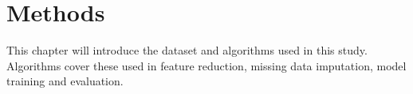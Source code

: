 \documentclass[12pt,a4paper,english
]{tunithesis}
\begin{document}

\chapter{Methods}
\label{ch:methods}
This chapter will introduce the dataset and algorithms used in this study. Algorithms cover these used in feature reduction, missing data imputation, model training and evaluation.
\end{document}
